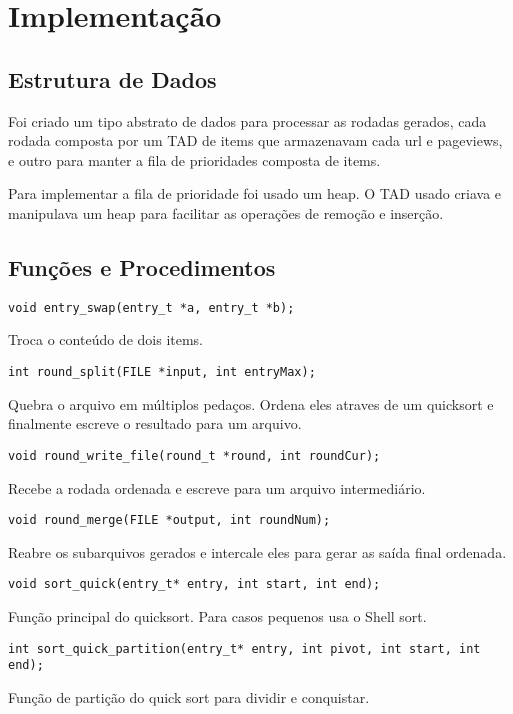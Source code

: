 \documentclass[a4paper, 11pt]{article}
\begin{document}
\section{Implementação}
\subsection{Estrutura de Dados}
Foi criado um tipo abstrato de dados para processar as rodadas gerados, cada rodada composta por um TAD de items que armazenavam cada url e pageviews, e outro para manter a fila de prioridades composta de items.

Para implementar a fila de prioridade foi usado um heap. O TAD usado criava e manipulava um heap para facilitar as operações de remoção e inserção.

\subsection{Funções e Procedimentos}
\begin{verbatim}
void entry_swap(entry_t *a, entry_t *b);
\end{verbatim}
Troca o conteúdo de dois items.

\begin{verbatim}
int round_split(FILE *input, int entryMax);
\end{verbatim}
Quebra o arquivo em múltiplos pedaços. Ordena eles atraves de um quicksort e finalmente escreve o resultado para um arquivo.

\begin{verbatim}
void round_write_file(round_t *round, int roundCur);
\end{verbatim}
Recebe a rodada ordenada e escreve para um arquivo intermediário.

\begin{verbatim}
void round_merge(FILE *output, int roundNum);
\end{verbatim}
Reabre os subarquivos gerados e intercale eles para gerar as saída final ordenada.

\begin{verbatim}
void sort_quick(entry_t* entry, int start, int end);
\end{verbatim}
Função principal do quicksort. Para casos pequenos usa o Shell sort.

\begin{verbatim}
int sort_quick_partition(entry_t* entry, int pivot, int start, int end);
\end{verbatim}
Função de partição do quick sort para dividir e conquistar.
\end{document}
